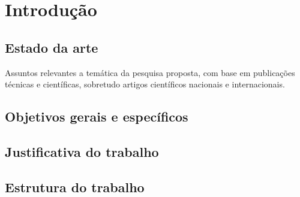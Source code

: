 \chapter[Introdução]{Introdução}

\section{Estado da arte}

Assuntos relevantes a temática da pesquisa proposta, com base em publicações técnicas e científicas, sobretudo artigos científicos nacionais e internacionais.   \cite{doxiadis1965}

\section{Objetivos gerais e específicos}

\section{Justificativa do trabalho}

\section{Estrutura do trabalho}

